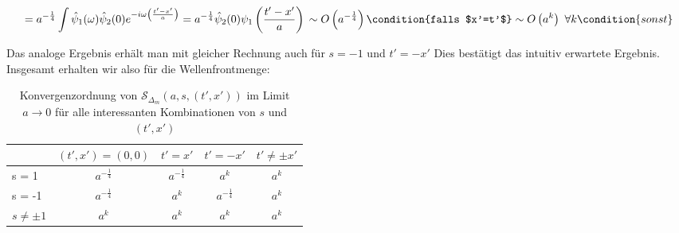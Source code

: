\begin{dmath}
 = a^{-\frac{1}{4}} \int \hat \psi_1(\omega) \hat \psi_2 (0)
    e^{-i\omega \left(\frac{t'-x'}{a}\right)}
= a^{-\frac{1}{4}} \hat \psi_2 (0) \psi_1\left(\frac{t'-x'}{a}\right)
\\
 \sim O\left(a^{-\frac{1}{4}}\right) \condition{falls $x'=t'$}
\\
 \sim O\left(a^k\right) ~ \forall k  \condition{sonst}
\end{dmath}

Das analoge Ergebnis erhält man mit gleicher Rechnung auch für $s=-1$ und $t' = -x'$
Dies bestätigt das intuitiv erwartete Ergebnis. Insgesamt erhalten wir also für die Wellenfrontmenge:

\begin{table}[h]
\centering
\label{my-label}
\begin{tabular}{l|cccc}
        & \multicolumn{1}{l}{$(t', x') = (0, 0)$} & \multicolumn{1}{l}{$t' = x'$} & \multicolumn{1}{l}{$t' = -x'$} & \multicolumn{1}{l}{$t' \neq \pm x'$} \\ \hline
s = 1   & $a^{-\frac{1}{4}}$    & $a^{-\frac{1}{4}}$    & $a^k$  & $a^k$    \\
s = -1  & $a^{-\frac{1}{4}}$    & $a^k$    & $a^{-\frac{1}{4}}$  & $a^k$    \\
$s \neq \pm 1$  & $a^k$         & $a^k$    & $a^k$               & $a^k$    \\
\end{tabular}
\caption{Konvergenzordnung von $\mathcal{S}_{\Delta_m} (a,s,(t',x'))$ im Limit $a \rightarrow 0$ für alle interessanten Kombinationen von $s$ und $(t',x')$}
\end{table}

